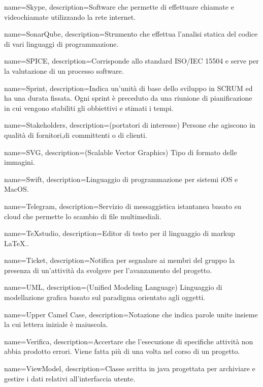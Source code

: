 {
name={Skype},
description={Software che permette di effettuare chiamate e videochiamate utilizzando la rete internet.}
}

{
name={SonarQube},
description={Strumento che effettua l’analisi statica del codice di vari linguaggi di programmazione.}
}

{
name={SPICE},
description={Corrisponde allo standard ISO/IEC 15504 e serve per la valutazione di un processo software.}
}

{
name={Sprint},
description={Indica un’unità di base dello sviluppo in SCRUM ed ha una durata fissata. Ogni sprint è preceduto da una riunione di pianificazione in cui vengono stabiliti gli obbiettivi e stimati i tempi.}
}

{
name={Stakeholders},
description={(portatori di interesse) Persone che agiscono in qualità di fornitori,di committenti o di clienti.}
}

{
name={SVG},
description={(Scalable Vector Graphics) Tipo di formato delle immagini.}
}

{
name={Swift},
description={Linguaggio di programmazione per sistemi iOS e MacOS.}
}

{
name={Telegram},
description={Servizio di messaggistica istantanea basato su cloud che permette lo scambio di file multimediali.}
}

{
name={TeXstudio},
description={Editor di testo per il linguaggio di markup \LaTeX..}
}

{
name={Ticket},
description={Notifica per segnalare ai membri del gruppo la presenza di un’attività da svolgere per l’avanzamento del progetto.}
}

{
name={UML},
description={(Unified Modeling Language) Linguaggio di modellazione grafica basato sul paradigma orientato agli oggetti.}
}

{
name={Upper Camel Case},
description={Notazione che indica parole unite insieme la cui lettera iniziale è maiuscola.}
}

{
name={Verifica},
description={Accertare che l’esecuzione di specifiche attività non abbia prodotto errori. Viene fatta più di una volta nel corso di un progetto.}
}

{
	name={ViewModel},
	description={Classe scritta in java progettata per archiviare e gestire i dati relativi all'interfaccia utente.}
}

